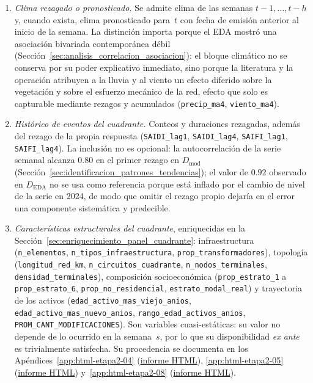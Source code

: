 \begin{enumerate}
    \item \textit{Clima rezagado o pronosticado.} Se admite clima de las semanas $t-1,\ldots,t-h$ y, cuando exista, clima pronosticado para~$t$ con fecha de emisión anterior al inicio de la semana. La distinción importa porque el EDA mostró una asociación bivariada contemporánea débil (Sección~\ref{sec:analisis_correlacion_asociacion}): el bloque climático no se conserva por su poder explicativo inmediato, sino porque la literatura y la operación atribuyen a la lluvia y al viento un efecto diferido sobre la vegetación y sobre el esfuerzo mecánico de la red, efecto que solo es capturable mediante rezagos y acumulados (\texttt{precip\_ma4}, \texttt{viento\_ma4}).
    \item \textit{Histórico de eventos del cuadrante.} Conteos y duraciones rezagadas, además del rezago de la propia respuesta (\texttt{SAIDI\_lag1}, \texttt{SAIDI\_lag4}, \texttt{SAIFI\_lag1}, \texttt{SAIFI\_lag4}). La inclusión no es opcional: la autocorrelación de la serie semanal alcanza $0{.}80$ en el primer rezago en $D_{\mathrm{mod}}$ (Sección~\ref{sec:identificacion_patrones_tendencias}); el valor de $0{.}92$ observado en $D_{\mathrm{EDA}}$ no se usa como referencia porque está inflado por el cambio de nivel de la serie en 2024, de modo que omitir el rezago propio dejaría en el error una componente sistemática y predecible.
    \item \textit{Características estructurales del cuadrante}, enriquecidas en la Sección~\ref{sec:enriquecimiento_panel_cuadrante}: infraestructura (\texttt{n\_elementos}, \texttt{n\_tipos\_infraestructura}, \texttt{prop\_transformadores}), topología (\texttt{longitud\_red\_km}, \texttt{n\_circuitos\_cuadrante}, \texttt{n\_nodos\_terminales}, \texttt{densidad\_terminales}), composición socioeconómica (\texttt{prop\_estrato\_1} a \texttt{prop\_estrato\_6}, \texttt{prop\_no\_residencial}, \texttt{estrato\_modal\_real}) y trayectoria de los activos (\texttt{edad\_activo\_mas\_viejo\_anios}, \texttt{edad\_activo\_mas\_nuevo\_anios}, \texttt{rango\_edad\_activos\_anios}, \texttt{PROM\_CANT\_MODIFICACIONES}). Son variables cuasi-estáticas: su valor no depende de lo ocurrido en la semana~$s$, por lo que su disponibilidad \emph{ex ante} es trivialmente satisfecha. Su procedencia se documenta en los Apéndices~\ref{app:html-etapa2-04} (\href{\urlEtapaDosCuatro}{informe HTML}), \ref{app:html-etapa2-05} (\href{\urlEtapaDosCinco}{informe HTML}) y~\ref{app:html-etapa2-08} (\href{\urlEtapaDosOcho}{informe HTML}).

\end{enumerate}
